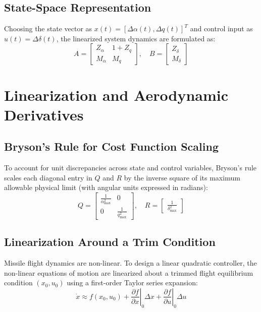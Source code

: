 \documentclass[11pt, a4paper]{article}
\begin{document}
\subsection{State-Space Representation}
Choosing the state vector as $x(t) = [\Delta \alpha(t), \Delta q(t)]^T$ and control input as $u(t) = \Delta \delta(t)$, the linearized system dynamics are formulated as:
\begin{equation}
A = \begin{bmatrix} Z_\alpha & 1 + Z_q \\ M_\alpha & M_q \end{bmatrix}, \quad B = \begin{bmatrix} Z_\delta \\ M_\delta \end{bmatrix}
\end{equation}


\section{Linearization and Aerodynamic Derivatives}

\subsection{Bryson's Rule for Cost Function Scaling}
To account for unit discrepancies across state and control variables, Bryson's rule scales each diagonal entry in $Q$ and $R$ by the inverse square of its maximum allowable physical limit (with angular units expressed in radians):
\begin{equation}
Q = \begin{bmatrix} \frac{1}{\alpha_{\max}^2} & 0 \\ 0 & \frac{1}{q_{\max}^2} \end{bmatrix}, \quad R = \begin{bmatrix} \frac{1}{\delta_{\max}^2} \end{bmatrix}
\end{equation}

\subsection{Linearization Around a Trim Condition}
Missile flight dynamics are non-linear. To design a linear quadratic controller, the non-linear equations of motion are linearized about a trimmed flight equilibrium condition $(x_0, u_0)$ using a first-order Taylor series expansion:
\begin{equation}
\dot{x} \approx f(x_0, u_0) + \left.\frac{\partial f}{\partial x}\right|_0 \Delta x + \left.\frac{\partial f}{\partial u}\right|_0 \Delta u
\end{equation}
\end{document}

